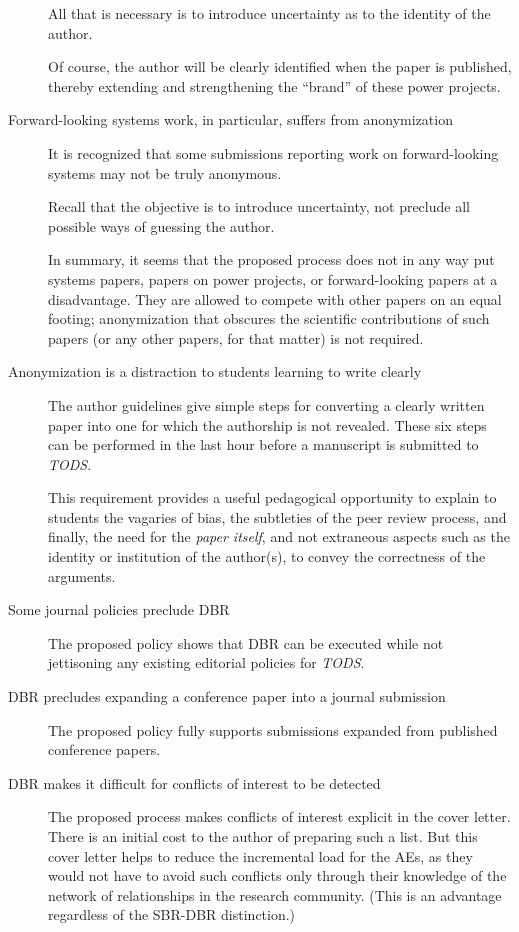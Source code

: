\documentclass[acmtods,acmnow]{acmtrans2m}
\newcommand{\tods}{{\em TODS\/}}
\begin{document}
\begin{description}
All that is necessary is to introduce uncertainty as to the identity of the
author. 

Of course, the author will be clearly identified when the paper is
published, thereby extending and strengthening the ``brand'' of these power
projects.

\item[Forward-looking systems work, in particular, suffers from
anonymization]
It is recognized that some submissions reporting work on forward-looking
systems may not be truly anonymous.

Recall that the objective is to introduce uncertainty, not preclude all
possible ways of guessing the author.

In summary, it seems that the proposed process does not in any way put
systems papers, papers on power projects, or forward-looking papers at a
disadvantage. They are allowed to compete with other papers on an equal
footing; anonymization that obscures the scientific contributions of such
papers (or any other papers, for that matter) is not required.

\item[Anonymization is a distraction to students learning to write  
clearly]
The author guidelines give simple steps for converting a clearly
written paper into one for which the authorship is not revealed. These
six steps can be performed in the last hour before a manuscript is
submitted to \tods.

This requirement provides a useful pedagogical
opportunity to explain to students the vagaries of bias, the subtleties of
the peer review process, and finally, the need for the
{\em paper itself}, and not extraneous aspects such as the identity or
institution of the author(s), to convey the correctness of the arguments.

\item[Some journal policies preclude DBR]
The proposed policy shows that DBR can be executed while not jettisoning any
existing editorial policies for \tods.

\item[DBR precludes expanding a conference paper into a journal submission]
The proposed policy fully supports submissions expanded from published
conference papers.

\item[DBR makes it difficult for conflicts of interest to be detected]
The proposed process makes conflicts of interest explicit in the cover
letter. There is an initial cost to the author of preparing such a list. But
this cover letter helps to reduce the incremental load for the AEs, as
they would not have to avoid such conflicts only through their knowledge of
the network of relationships in the research community. (This is an
advantage regardless of the SBR-DBR distinction.)


\end{description}
\end{document}
